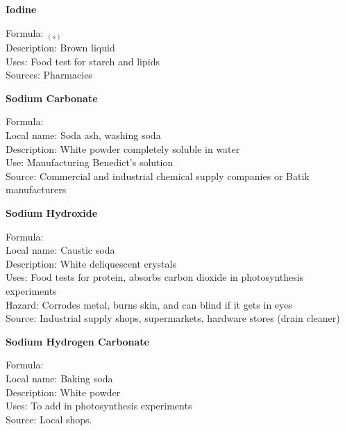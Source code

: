 \begin{flushleft}
\textbf{Iodine}
\end{flushleft}
\vspace{-10pt}
Formula: $_{(s)}$\\
Description: Brown liquid\\
Uses: Food test for starch and lipids\\
Sources: Pharmacies

\begin{flushleft}
\textbf{Sodium Carbonate}
\end{flushleft}
\vspace{-10pt}
Formula: \\
Local name: Soda ash, washing soda\\
Description: White powder completely soluble in water\\
Use: Manufacturing Benedict's solution\\
Source: Commercial and industrial chemical supply companies or Batik manufacturers\\

\begin{flushleft}
\textbf{Sodium Hydroxide}
\end{flushleft}
\vspace{-10pt}
Formula: \\
Local name: Caustic soda\\
Description: White deliquescent crystals \\
Uses: Food tests for protein, absorbs carbon dioxide in photosynthesis experiments\\
Hazard: Corrodes metal, burns skin, and can blind if it gets in eyes\\
Source: Industrial supply shops, supermarkets, hardware stores (drain cleaner)\\

\begin{flushleft}
\textbf{Sodium Hydrogen Carbonate}
\end{flushleft}
\vspace{-10pt}
Formula: \\
Local name: Baking soda\\
Description: White powder \\
Uses: To add  in photosynthesis experiments\\
Source: Local shops.
